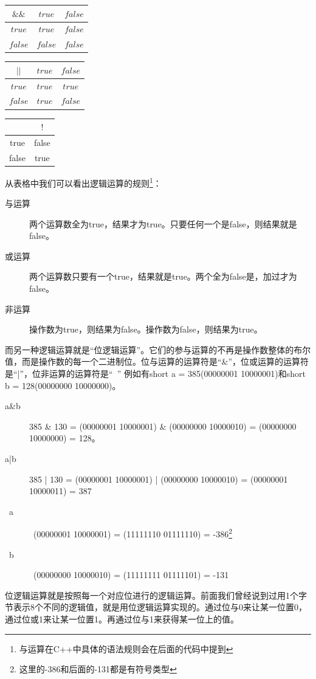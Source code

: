 \begin{center}
	\label{tab:andOpr}
	\begin{tabular}{|c|c|c|}
		\hline
			$\&\&$	&	$true$	&	$false$	\\
		\hline
			$true$	&	$true$	&	$false$	\\
		\hline
			$false$	&	$false$	&	$false$	\\
		\hline
	\end{tabular}
\end{center}

\begin{center}
	\label{tab:orOpr}
	\begin{tabular}{|c|c|c|}
		\hline
			$||$	&	$true$	&	$false$	\\
		\hline
			$true$	&	$true$	&	$true$	\\
		\hline
			$false$	&	$true$	&	$false$	\\
		\hline
	\end{tabular}
\end{center}


\begin{center}
	\label{tab:notOpr}
	\begin{tabular}{|c|c|}
		\hline
					&	$!$		\\
		\hline
			true	&	false	\\
		\hline
			false	&	true	\\
		\hline
	\end{tabular}
\end{center}

从表格中我们可以看出逻辑运算的规则\footnote{与运算在C++中具体的语法规则会在后面的代码中提到}：
\begin{description}
	\item[与运算]两个运算数全为true，结果才为true。只要任何一个是false，则结果就是false。
	\item[或运算]两个运算数只要有一个true，结果就是true。两个全为false是，加过才为false。
	\item[非运算]操作数为true，则结果为false。操作数为false，则结果为true。
\end{description}

而另一种逻辑运算就是“位逻辑运算”。它们的参与运算的不再是操作数整体的布尔值，而是操作数的每一个二进制位。位与运算的运算符是“\&”，位或运算的运算符是“|”，位非运算的运算符是“~”
例如有short a = 385(00000001 10000001)和short b = 128(00000000 10000000)。
\begin{description}
	\item[a\&b] 385 \& 130 = (00000001 10000001) \& (00000000 10000010) = (00000000 10000000) = 128。
	\item[a|b] 385 | 130 = (00000001 10000001) | (00000000 10000010) = (00000001 10000011) = 387
	\item[~a] ~(00000001 10000001) = (11111110 01111110) = -386\footnote{这里的-386和后面的-131都是有符号类型}
	\item[~b] ~(00000000 10000010) = (11111111 01111101) = -131
\end{description}
位逻辑运算就是按照每一个对应位进行的逻辑运算。前面我们曾经说到过用1个字节表示8个不同的逻辑值，就是用位逻辑运算实现的。通过位与0来让某一位置0，通过位或1来让某一位置1。再通过位与1来获得某一位上的值。

